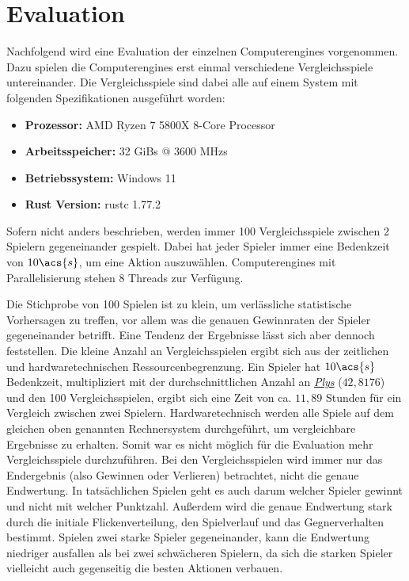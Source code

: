 \chapter{Evaluation}
\label{chapter:evaluation}


Nachfolgend wird eine Evaluation der einzelnen Computerengines vorgenommen. Dazu spielen die Computerengines erst einmal verschiedene Vergleichsspiele untereinander. Die Vergleichsspiele sind dabei alle auf einem System mit folgenden Spezifikationen ausgeführt worden:

\begin{itemize}
    \item \vspace{-0.15cm} \textbf{Prozessor:} \ac{AMD} Ryzen 7 5800X 8-Core Processor
    \item \vspace{-0.15cm} \textbf{Arbeitsspeicher:} 32 \acsp{GiB} @ 3600 \acsp{MHz}
    \item \vspace{-0.15cm} \textbf{Betriebssystem:} Windows 11
    \item \vspace{-0.15cm} \textbf{Rust Version:} rustc 1.77.2
\end{itemize}

Sofern nicht anders beschrieben, werden immer 100 Vergleichsspiele zwischen 2 Spielern gegeneinander gespielt. Dabei hat jeder Spieler immer eine Bedenkzeit von $10\acs{s}$, um eine Aktion auszuwählen. Computerengines mit Parallelisierung stehen 8 Threads zur Verfügung.

Die Stichprobe von 100 Spielen ist zu klein, um verlässliche statistische Vorhersagen zu treffen, vor allem was die genauen Gewinnraten der Spieler gegeneinander betrifft. Eine Tendenz der Ergebnisse lässt sich aber dennoch feststellen. Die kleine Anzahl an Vergleichsspielen ergibt sich aus der zeitlichen und hardwaretechnischen Ressourcenbegrenzung. Ein Spieler hat $10\acs{s}$ Bedenkzeit, multipliziert mit der durchschnittlichen Anzahl an \hyperref[text:ply]{\emph{Plys}} ($42{,}8176$) und den 100 Vergleichsspielen, ergibt sich eine Zeit von ca. $11,89$ Stunden für ein Vergleich zwischen zwei Spielern. Hardwaretechnisch werden alle Spiele auf dem gleichen oben genannten Rechnersystem durchgeführt, um vergleichbare Ergebnisse zu erhalten. Somit war es nicht möglich für die Evaluation mehr Vergleichsspiele durchzuführen. Bei den Vergleichsspielen wird immer nur das Endergebnis (also Gewinnen oder Verlieren) betrachtet, nicht die genaue Endwertung. In tatsächlichen Spielen geht es auch darum welcher Spieler gewinnt und nicht mit welcher Punktzahl. Außerdem wird die genaue Endwertung stark durch die initiale Flickenverteilung, den Spielverlauf und das Gegnerverhalten bestimmt. Spielen zwei starke Spieler gegeneinander, kann die Endwertung niedriger ausfallen als bei zwei schwächeren Spielern, da sich die starken Spieler vielleicht auch gegenseitig die besten Aktionen verbauen.

